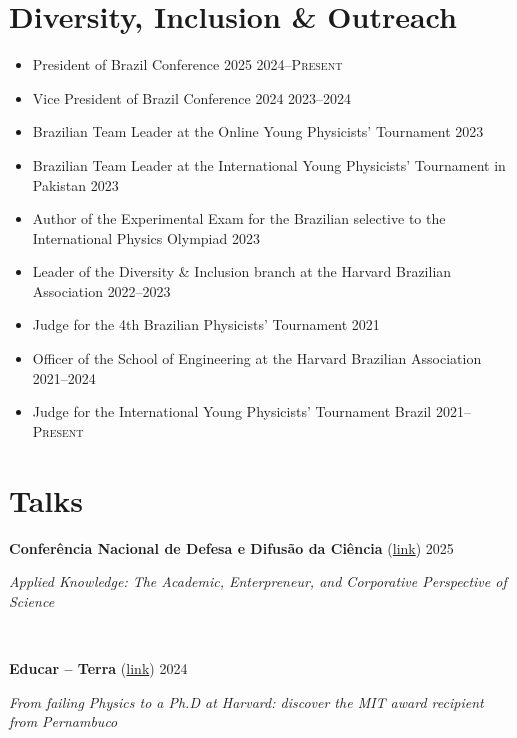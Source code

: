 \documentclass[letterpaper,10pt]{article}
\newcommand{\entry}[4]{

\begin{minipage}[t]{.15\textwidth}
\end{minipage}
\hfill\vline\hfill 
\begin{minipage}[t]{0.95\textwidth}
#2 \hfill \textsc{#1}

\textit{#3}

\footnotesize{#4}
\end{minipage}\\\vspace{.25cm}}
\begin{document}
\section{Diversity, Inclusion \& Outreach}
\begin{itemize}
	\item President of Brazil Conference 2025
    \hfill\textsc{2024--Present}

    \item Vice President of Brazil Conference 2024
    \hfill\textsc{2023--2024}

    \item Brazilian Team Leader at the Online Young Physicists' Tournament
    \hfill\textsc{2023}

	\item Brazilian Team Leader at the International Young Physicists' Tournament in Pakistan
    \hfill\textsc{2023}

    \item Author of the Experimental Exam for the Brazilian selective to the International Physics Olympiad
    \hfill\textsc{2023}

    \item Leader of the Diversity \& Inclusion branch at the Harvard Brazilian Association
	\hfill\textsc{2022--2023}

    \item Judge for the 4th Brazilian Physicists' Tournament
    \hfill\textsc{2021}

    \item Officer of the School of Engineering at the Harvard Brazilian Association
	\hfill\textsc{2021--2024}

    \item Judge for the International Young Physicists' Tournament Brazil
	\hfill\textsc{2021--Present}
	\end{itemize}
\vspace*{-.25cm}
\section{Talks}

\entry{2025}{\textbf{Conferência Nacional de Defesa e Difusão da Ciência} (\href{https://www.youtube.com/live/LHjNjV-f6q0?si=0vh8dLnf76PwcLZl&t=20177}{link})}{Applied Knowledge: The Academic, Enterpreneur, and Corporative Perspective of Science}{}

\entry{2024}{\textbf{Educar -- Terra} (\href{https://www.terra.com.br/noticias/educacao/da-recuperacao-em-fisica-ao-phd-em-harvard-conheca-a-historia-do-pernambucano-premiado-pelo-mit,3ed69c5460e41efbfe796dffdf6c47c4shi065se.html}{link})}{From failing Physics to a Ph.D at Harvard: discover the MIT award recipient from Pernambuco}{}
\end{document}
